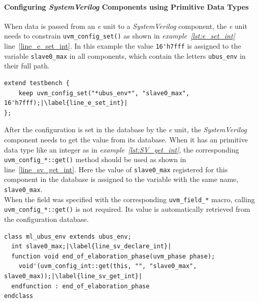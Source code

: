 \paragraph{Configuring \emph{SystemVerilog} Components using Primitive Data Types}\label{config_sv_primitive}

When data is passed from an \textit{e} unit to a \emph{SystemVerilog} component,
the \textit{e} unit needs to constrain \lstinline$uvm_config_set()$ as shown in \emph{example~\ref{lst:e_set_int}}
line~\ref{line_e_set_int}. In this example the value \lstinline$16'h7fff$ is assigned to the variable
\lstinline$slave0_max$ in all components, which contain the letters \lstinline$ubus_env$ in their full path.

\lstset{language=e, numbers = left, escapechar=|, breaklines=true}
\begin{lstlisting}[frame=htrbl, caption={\textit{e}: register an integer in configuration database},
label={lst:e_set_int}]
extend testbench {
    keep uvm_config_set("*ubus_env*", "slave0_max", 16'h7fff);|\label{line_e_set_int}|
};
\end{lstlisting}

After the configuration is set in the database by the \textit{e} unit, the \emph{SystemVerilog} component needs to get
the value from its database. When it has an primitive data type like an integer as in \emph{example~\ref{lst:SV_get_int}},
the corresponding \lstinline$uvm_config_*::get()$ method should be used as shown in line~\ref{line_sv_get_int}. Here the
value of \lstinline$slave0_max$ registered for this component in the database is assigned to the variable with the same
name, \lstinline$slave0_max$.\\
When the field was specified with the corresponding \lstinline$uvm_field_*$ macro, calling
\lstinline$uvm_config_*::get()$ is not required. Its value is automatically retrieved from the configuration database.

\lstset{language=SystemVerilog, numbers = left, escapechar=|, breaklines=true}
\begin{lstlisting}[frame=htrbl, caption={SystemVerilog: getting an integer from configuration database},
label={lst:SV_get_int}]
class ml_ubus_env extends ubus_env;
  int slave0_max;|\label{line_sv_declare_int}|
  function void end_of_elaboration_phase(uvm_phase phase);
    void'(uvm_config_int::get(this, "", "slave0_max", slave0_max));|\label{line_sv_get_int}|
  endfunction : end_of_elaboration_phase
endclass
\end{lstlisting}

